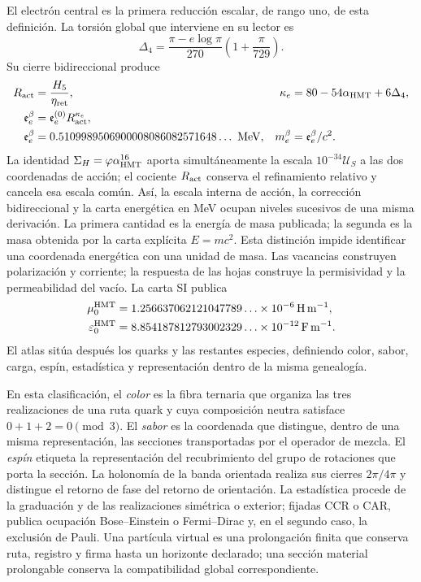 El electrón central es la primera reducción escalar, de rango uno, de esta
definición. La torsión global que interviene en su lector es
\[
 \Delta_4=\frac{\pi-e\log\pi}{270}
 \left(1+\frac{\pi}{729}\right).
\]
Su cierre bidireccional produce
\[
 \begin{aligned}
 R_{\rm act}&=\frac{H_5}{\eta_{\rm ret}},
 &\kappa_e&=80-54\alpha_{\rm HMT}+6\Delta_4,\\
 \mathfrak e_e^\beta&=\mathfrak e_e^{(0)}R_{\rm act}^{\kappa_e},\\
 \mathfrak e_e^\beta
 &=0.5109989506900008086082571648\ldots\ {\rm MeV},
 &m_e^\beta&=\mathfrak e_e^\beta/c^2.
 \end{aligned}
\]
La identidad
\(\Sigma_H=\varphi\alpha_{\rm HMT}^{16}\) aporta simultáneamente la
escala \(10^{-34}\mathcal U_S\) a las dos coordenadas de acción; el
cociente \(R_{\rm act}\) conserva el refinamiento relativo y cancela esa
escala común. Así, la escala interna de acción, la corrección bidireccional y la
carta energética en MeV ocupan niveles sucesivos de una misma derivación.
La primera cantidad es la energía de masa publicada; la segunda es la masa
obtenida por la carta explícita $E=mc^2$. Esta distinción impide identificar
una coordenada energética con una unidad de masa.
Las vacancias construyen polarización y corriente; la respuesta de las hojas
construye la permisividad y la permeabilidad del vacío. La carta SI publica
\[
 \begin{aligned}
 \mu_0^{\rm HMT}
 &=1.256637062121047789\ldots\times10^{-6}\,\mathrm{H\,m^{-1}},\\
 \varepsilon_0^{\rm HMT}
 &=8.854187812793002329\ldots\times10^{-12}\,\mathrm{F\,m^{-1}}.
 \end{aligned}
\]
El atlas sitúa después
los quarks y las restantes especies, definiendo color, sabor, carga, espín,
estadística y representación dentro de la misma genealogía.

En esta clasificación, el \emph{color} es la fibra ternaria que organiza las
tres realizaciones de una ruta quark y cuya composición neutra satisface
\(0+1+2=0\pmod3\). El \emph{sabor} es la coordenada que distingue, dentro
de una misma representación, las secciones transportadas por el operador de
mezcla. El \emph{espín} etiqueta la representación del recubrimiento del
grupo de rotaciones que porta la sección. La holonomía de la banda orientada
realiza sus cierres \(2\pi/4\pi\) y distingue el retorno de fase del retorno
de orientación. La estadística procede de la
graduación y de las realizaciones simétrica o exterior; fijadas CCR o CAR,
publica ocupación Bose--Einstein o Fermi--Dirac y, en el segundo caso, la
exclusión de Pauli. Una partícula virtual es una prolongación finita que
conserva ruta, registro y firma hasta un horizonte declarado; una sección
material prolongable conserva la compatibilidad global correspondiente.

